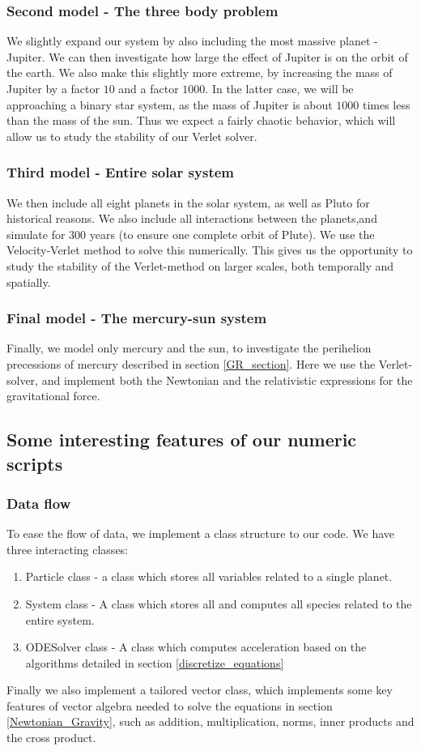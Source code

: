 \documentclass[a4paper, 10pt]{article}
\begin{document}
\subsubsection{Second model - The three body problem}
We slightly expand our system by also including the most massive planet - Jupiter. We can then investigate how large the effect of Jupiter is on the orbit of the earth. We also make this slightly more extreme, by increasing the mass of Jupiter by a factor $10$ and a factor $1000$. In the latter case, we will be approaching a binary star system, as the mass of Jupiter is about $1000$ times less than the mass of the sun. Thus we expect a fairly chaotic behavior, which will allow us to study the stability of our Verlet solver.
\subsubsection{Third model - Entire solar system}
We then include all eight planets in the solar system, as well as Pluto for historical reasons. We also include all interactions between the planets,and simulate for 300 years (to ensure one complete orbit of Plute). We use the Velocity-Verlet method to solve this numerically. This gives us the opportunity to study the stability of the Verlet-method on larger scales, both temporally and spatially.
\subsubsection{Final model - The mercury-sun system}
Finally, we model only mercury and the sun, to investigate the perihelion precessions of mercury described in section \ref{GR_section}. Here we use the Verlet-solver, and implement both the Newtonian and the relativistic expressions for the gravitational force.
\subsection{Some interesting features of our numeric scripts}
\subsubsection{Data flow}
To ease the flow of data, we implement a class structure to our code. We have three interacting classes:
\begin{enumerate}
\item Particle class - a class which stores all variables related to a single planet.
\item System class - A class which stores all and computes all species related to the entire system.
\item ODESolver class - A class which computes acceleration based on the algorithms detailed in section \ref{discretize_equations}
\end{enumerate}
Finally we also implement a tailored vector class, which implements some key features of vector algebra needed to solve the equations in section \ref{Newtonian_Gravity}, such as addition, multiplication, norms, inner products and the cross product.
\end{document}
